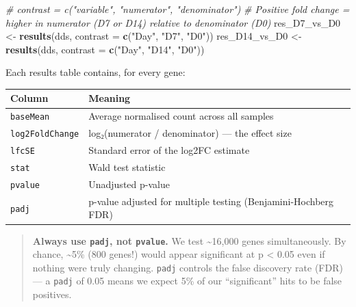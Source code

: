 \documentclass[
]{article}
\newenvironment{Shaded}{\begin{snugshade}}{\end{snugshade}}
\newcommand{\AttributeTok}[1]{\textcolor[rgb]{0.13,0.29,0.53}{#1}}
\newcommand{\CommentTok}[1]{\textcolor[rgb]{0.56,0.35,0.01}{\textit{#1}}}
\newcommand{\FunctionTok}[1]{\textcolor[rgb]{0.13,0.29,0.53}{\textbf{#1}}}
\newcommand{\NormalTok}[1]{#1}
\newcommand{\OtherTok}[1]{\textcolor[rgb]{0.56,0.35,0.01}{#1}}
\newcommand{\StringTok}[1]{\textcolor[rgb]{0.31,0.60,0.02}{#1}}
\begin{document}
\begin{Shaded}
\begin{Highlighting}[]
\CommentTok{\# contrast = c("variable", "numerator", "denominator")}
\CommentTok{\# Positive fold change = higher in numerator (D7 or D14) relative to denominator (D0)}
\NormalTok{res\_D7\_vs\_D0  }\OtherTok{\textless{}{-}} \FunctionTok{results}\NormalTok{(dds, }\AttributeTok{contrast =} \FunctionTok{c}\NormalTok{(}\StringTok{"Day"}\NormalTok{, }\StringTok{"D7"}\NormalTok{,  }\StringTok{"D0"}\NormalTok{))}
\NormalTok{res\_D14\_vs\_D0 }\OtherTok{\textless{}{-}} \FunctionTok{results}\NormalTok{(dds, }\AttributeTok{contrast =} \FunctionTok{c}\NormalTok{(}\StringTok{"Day"}\NormalTok{, }\StringTok{"D14"}\NormalTok{, }\StringTok{"D0"}\NormalTok{))}
\end{Highlighting}
\end{Shaded}

Each results table contains, for every gene:

\begin{longtable}[]{@{}
  >{\raggedright\arraybackslash}p{}
  >{\raggedright\arraybackslash}p{}@{}}
\toprule\noalign{}
\begin{minipage}[b]{\linewidth}\raggedright
Column
\end{minipage} & \begin{minipage}[b]{\linewidth}\raggedright
Meaning
\end{minipage} \\
\midrule\noalign{}
\endhead
\bottomrule\noalign{}
\endlastfoot
\texttt{baseMean} & Average normalised count across all samples \\
\texttt{log2FoldChange} & log₂(numerator / denominator) --- the effect
size \\
\texttt{lfcSE} & Standard error of the log2FC estimate \\
\texttt{stat} & Wald test statistic \\
\texttt{pvalue} & Unadjusted p-value \\
\texttt{padj} & p-value adjusted for multiple testing
(Benjamini-Hochberg FDR) \\
\end{longtable}

\begin{quote}
\textbf{Always use \texttt{padj}, not \texttt{pvalue}.} We test
\textasciitilde16,000 genes simultaneously. By chance,
\textasciitilde5\% (800 genes!) would appear significant at p
\textless{} 0.05 even if nothing were truly changing. \texttt{padj}
controls the false discovery rate (FDR) --- a \texttt{padj} of 0.05
means we expect 5\% of our ``significant'' hits to be false positives.
\end{quote}
\end{document}
